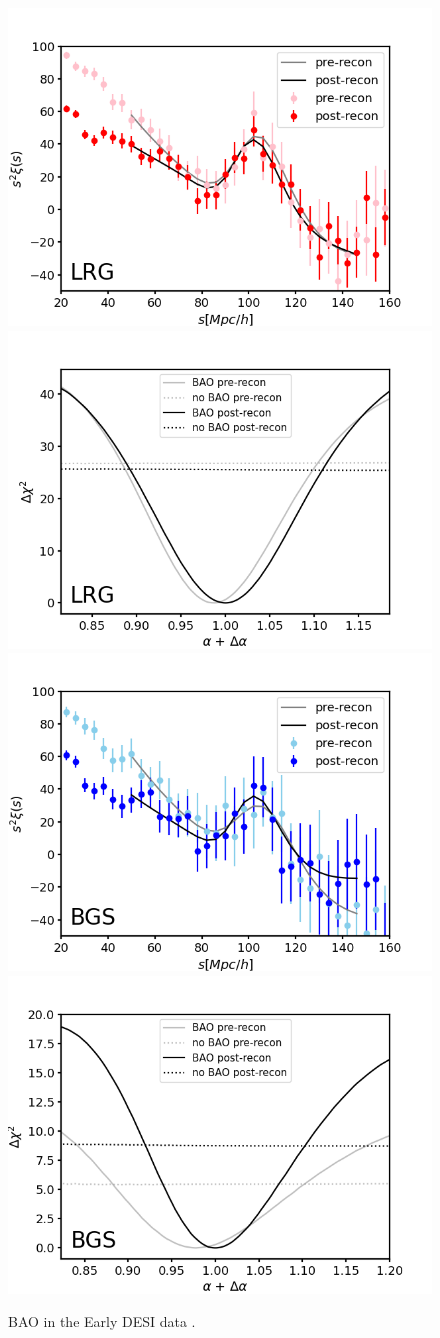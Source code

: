 \begin{figure}[htbp]
    \centering
    \includegraphics[width=0.495\linewidth]{DESI-M2/plot_BAO_fit_LRG_pre_and_post.png}
    \includegraphics[width=0.495\linewidth]{DESI-M2/plot_significance_alpha_LRG_pre_and_post_rescaled_v2.png} \\
    \includegraphics[width=0.495\linewidth]{DESI-M2/plot_BAO_fit_BGS_pre_and_post.png}
    \includegraphics[width=0.495\linewidth]{DESI-M2/plot_significance_alpha_BGS_pre_and_post_rescaled_v2.png}
    \caption[BAO in the Early DESI data]{BAO in the Early DESI data \citep[from the first two months of the main DESI survey, DESI-M2; figure reproduced from][]{BAO.EDR.Moon.2023}.
}
\end{figure}
